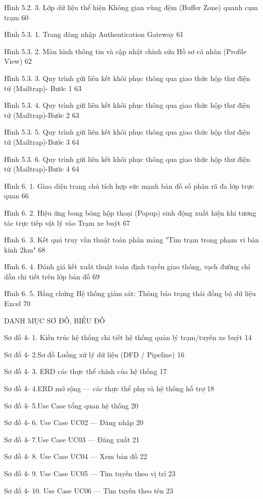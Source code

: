 \documentclass[13pt,a4paper]{report}
\begin{document}
Hình 5.2. 3. Lớp dữ liệu thể hiện Không gian vùng đệm (Buffer Zone) quanh cụm trạm	60

Hình 5.3. 1. Trang đăng nhập Authentication Gateway	61

Hình 5.3. 2. Màn hình thông tin và cập nhật chỉnh sửa Hồ sơ cá nhân (Profile View)	62

Hình 5.3. 3. Quy trình gửi liên kết khôi phục thông qua giao thức hộp thư điện tử (Mailtrap)- Bước 1	63

Hình 5.3. 4. Quy trình gửi liên kết khôi phục thông qua giao thức hộp thư điện tử (Mailtrap)-Bước 2	63

Hình 5.3. 5. Quy trình gửi liên kết khôi phục thông qua giao thức hộp thư điện tử (Mailtrap)-Bước 3	64

Hình 5.3. 6. Quy trình gửi liên kết khôi phục thông qua giao thức hộp thư điện tử (Mailtrap)-Bước 4	64

Hình 6. 1. Giao diện trang chủ tích hợp sức mạnh bản đồ số phân rã đa lớp trực quan	66

Hình 6. 2. Hiệu ứng bong bóng hộp thoại (Popup) sinh động xuất hiện khi tương tác trực tiếp vật lý vào Trạm xe buýt	67

Hình 6. 3. Kết quả truy vấn thuật toán phân mảng "Tìm trạm trong phạm vi bán kính 2km"	68

Hình 6. 4. Đánh giá kết xuất thuật toán định tuyến giao thông, vạch đường chỉ dẫn chi tiết trên lớp bản đồ	69

Hình 6. 5. Bằng chứng Hệ thống giám sát: Thông báo trạng thái đồng bộ dữ liệu Excel	70

DANH MỤC SƠ ĐỒ, BIỂU ĐỒ

Sơ đồ 4- 1. Kiến trúc hệ thống chi tiết hệ thống quản lý trạm/tuyến xe buýt	14

Sơ đồ 4- 2.Sơ đồ Luồng xử lý dữ liệu (DFD / Pipeline)	16

Sơ đồ 4- 3. ERD các thực thể chính của hệ thống	17

Sơ đồ 4- 4.ERD mở rộng — các thực thể phụ và hệ thống hỗ trợ	18

Sơ đồ 4- 5.Use Case tổng quan hệ thống	20

Sơ đồ 4- 6. Use Case UC02 — Đăng nhập	20

Sơ đồ 4- 7.Use Case UC03 — Đăng xuất	21

Sơ đồ 4- 8. Use Case UC04 — Xem bản đồ	22

Sơ đồ 4- 9. Use Case UC05 — Tìm tuyến theo vị trí	23

Sơ đồ 4- 10. Use Case UC06 — Tìm tuyến theo tên	23
\end{document}
